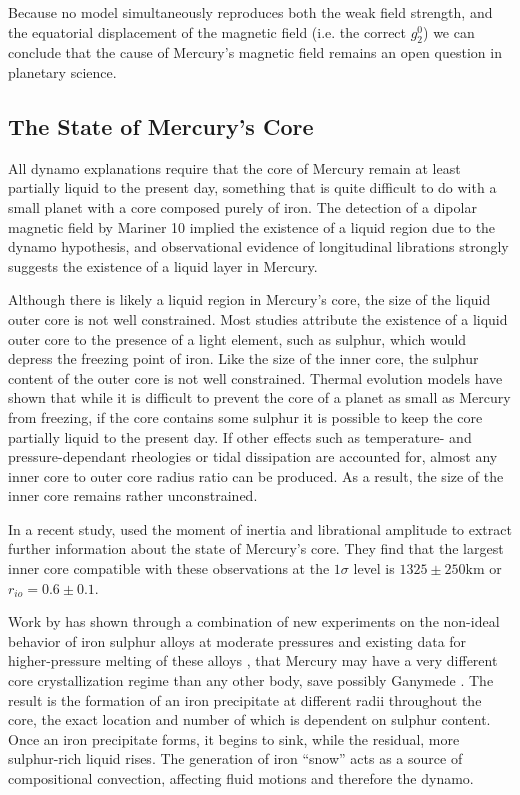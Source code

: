 Because no model simultaneously reproduces both the weak field strength, and the equatorial displacement of the magnetic field (i.e. the correct $g_2^0$) we can conclude that the cause of Mercury's magnetic field remains an open question in planetary science.

\subsection{The State of Mercury's Core}

All dynamo explanations require that the core of Mercury remain at least partially liquid to the present day, something that is quite difficult to do with a small planet with a core composed purely of iron. The detection of a dipolar magnetic field by Mariner 10 implied the existence of a liquid region due to the dynamo hypothesis, and observational evidence of longitudinal librations \citep{margot2007, margot2012} strongly suggests the existence of a liquid layer in Mercury. 

Although there is likely a liquid region in Mercury's core, the size of the liquid outer core is not well constrained. Most studies attribute the existence of a liquid outer core to the presence of a light element, such as sulphur, which would depress the freezing point of iron. Like the size of the inner core, the sulphur content of the outer core is not well constrained. Thermal evolution models \citep{schubertandross88} have shown that while it is difficult to prevent the core of a planet as small as Mercury from freezing, if the core contains some sulphur it is possible to keep the core partially liquid to the present day. If other effects such as temperature- and pressure-dependant rheologies \citep{conzelmann99,hauck04,brueur07} or tidal dissipation \citep{schubertandross88} are accounted for, almost any inner core to outer core radius ratio can be produced. As a result, the size of the inner core remains rather unconstrained. 

In a recent study, \citet{dumberry2015} used the moment of inertia and librational amplitude to extract further information about the state of Mercury's core. They find that the largest inner core compatible with these observations at the $1\sigma$ level is $1325 \pm 250\textrm{km}$ or $r_{io}=0.6\pm 0.1$.

Work by \citet{chenetal2008} has shown through a combination of new experiments on the non-ideal behavior of iron sulphur alloys at moderate pressures and existing data for higher-pressure melting of these alloys \citep{stewart07}, that Mercury may have a very different core crystallization regime than any other body, save possibly Ganymede \citep{hauck06}. The result is the formation of an iron precipitate at different radii throughout the core, the exact location and number of which is dependent on sulphur content. Once an iron precipitate forms, it begins to sink, while the residual, more sulphur-rich liquid rises. The generation of iron ``snow'' acts as a source of compositional convection, affecting fluid motions and therefore the dynamo.

